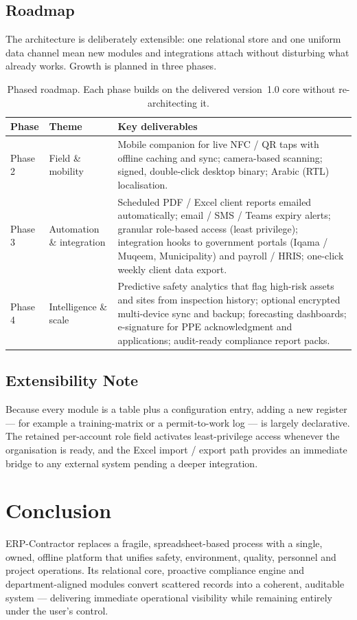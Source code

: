 \documentclass[11pt]{article}
\begin{document}
\subsection{Roadmap}
The architecture is deliberately extensible: one relational store and one uniform data channel mean new
modules and integrations attach without disturbing what already works. Growth is planned in three phases.

\begin{table}[H]
\centering\small
\begin{tabular}{@{}l l p{8.2cm}@{}}
\toprule
\textbf{Phase} & \textbf{Theme} & \textbf{Key deliverables} \\
\midrule
Phase 2 & Field \& mobility &
  Mobile companion for live NFC / QR taps with offline caching and sync; camera-based scanning;
  signed, double-click desktop binary; Arabic (RTL) localisation. \\[2pt]
Phase 3 & Automation \& integration &
  Scheduled PDF / Excel client reports emailed automatically; email / SMS / Teams expiry alerts;
  granular role-based access (least privilege); integration hooks to government portals
  (Iqama / Muqeem, Municipality) and payroll / HRIS; one-click weekly client data export. \\[2pt]
Phase 4 & Intelligence \& scale &
  Predictive safety analytics that flag high-risk assets and sites from inspection history; optional
  encrypted multi-device sync and backup; forecasting dashboards; e-signature for PPE acknowledgment
  and applications; audit-ready compliance report packs. \\
\bottomrule
\end{tabular}
\caption{Phased roadmap. Each phase builds on the delivered version~1.0 core without re-architecting it.}
\end{table}

\subsection{Extensibility Note}
Because every module is a table plus a configuration entry, adding a new register --- for example a
training-matrix or a permit-to-work log --- is largely declarative. The retained per-account role field
activates least-privilege access whenever the organisation is ready, and the Excel import / export path
provides an immediate bridge to any external system pending a deeper integration.

\section{Conclusion}
ERP-Contractor replaces a fragile, spreadsheet-based process with a single, owned, offline platform that
unifies safety, environment, quality, personnel and project operations. Its relational core, proactive
compliance engine and department-aligned modules convert scattered records into a coherent, auditable
system --- delivering immediate operational visibility while remaining entirely under the user's control.
\end{document}
